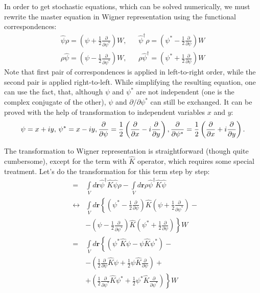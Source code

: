 \documentclass[12pt,notitlepage]{report}
\begin{document}
In order to get stochastic equations, which can be solved numerically,
we must rewrite the master equation in Wigner representation using the functional correspondences:
\begin{eqnarray*}
\hat{\psi} \rho = \left( \psi + \frac{1}{2} \frac{\partial}{\partial \psi^*} \right) W, & &
\hat{\psi}^\dagger \rho = \left( \psi^* - \frac{1}{2} \frac{\partial}{\partial \psi} \right) W \\
\rho \hat{\psi} = \left( \psi - \frac{1}{2} \frac{\partial}{\partial \psi^*} \right) W, & &
\rho \hat{\psi}^\dagger = \left( \psi^* + \frac{1}{2} \frac{\partial}{\partial \psi} \right) W
\end{eqnarray*}
Note that first pair of correspondences is applied in left-to-right order, while the second pair is applied right-to-left.
While simplifying the resulting equation, one can use the fact, that, although $\psi$ and $\psi^*$ are not independent
(one is the complex conjugate of the other), $\psi$ and $\partial/\partial\psi^*$ can still be exchanged.
It can be proved with the help of transformation to independent variables $x$ and $y$:
\[
\psi = x + iy,\, \psi^* = x - iy,\, \\
\frac{\partial}{\partial\psi} = \frac{1}{2} \left( \frac{\partial}{\partial x} - i \frac{\partial}{\partial y} \right),\, \\
\frac{\partial}{\partial\psi^*} = \frac{1}{2} \left( \frac{\partial}{\partial x} + i \frac{\partial}{\partial y} \right).
\]

The transformation to Wigner representation is straightforward (though quite cumbersome),
except for the term with $\hat{K}$ operator, which requires some special treatment.
Let's do the transformation for this term step by step:
\begin{eqnarray}
[ \int\limits_V \hat{\psi}^\dagger \hat{K} \hat{\psi}, \rho ]
& = & \int\limits_V d\textbf{r} \hat{\psi}^\dagger \hat{K} \hat{\psi} \rho - \int\limits_V d\textbf{r} \rho \hat{\psi}^\dagger \hat{K} \hat{\psi} \nonumber \\
& \leftrightarrow & \int\limits_V d\textbf{r} \left\{ \left( \psi^* - \frac{1}{2}\frac{\partial}{\partial\psi}\right) \hat{K} \left( \psi + \frac{1}{2}\frac{\partial}{\partial\psi^*} \right) - \nonumber \right. \\
& & \left. - \left( \psi - \frac{1}{2}\frac{\partial}{\partial\psi^*}\right) \hat{K} \left( \psi^* + \frac{1}{2}\frac{\partial}{\partial\psi}  \right) \right\} W \nonumber \\
& = & \int\limits_V d\textbf{r} \left\{ \left( \psi^* \hat{K} \psi - \psi \hat{K} \psi^* \right) -  \right. \label{annihilating_psi_K_psi} \\
& & \left. - \left( \frac{1}{2}\frac{\partial}{\partial\psi} \hat{K} \psi +
\frac{1}{2} \psi \hat{K} \frac{\partial}{\partial\psi} \right) \right. + \label{dpsi_K_psi_term} \\
& & \left. + \left( \frac{1}{2}\frac{\partial}{\partial\psi^*} \hat{K} \psi^* +
\frac{1}{2} \psi^* \hat{K} \frac{\partial}{\partial\psi^*} \right) \right\} W \label{dpsi_star_K_psi_star_term}
\end{eqnarray}
\end{document}
